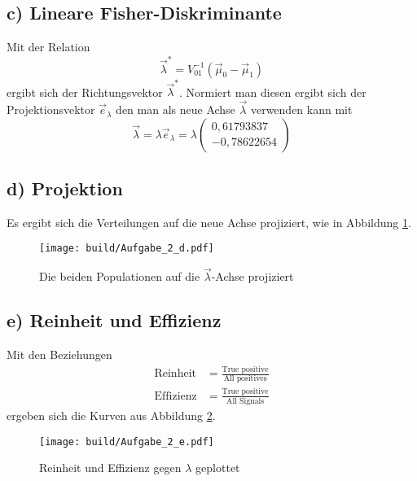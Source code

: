 \subsection*{c) Lineare Fisher-Diskriminante}
Mit der Relation
\begin{equation}
    \vec{\lambda}^*=V_{01}^{-1}\left(\vec{\mu}_0 -\vec{\mu}_1 \right)
    \label{eqn:lambda}
\end{equation}
ergibt sich der Richtungsvektor $\vec{\lambda}^*$. Normiert man diesen ergibt sich der Projektionsvektor $\vec{e}_{\lambda}$
den man als neue Achse $\vec{\lambda}$ verwenden kann mit 
\begin{equation}
    \vec{\lambda}=\lambda\vec{e}_{\lambda}=\lambda\left(\begin{array}{c}
        0,61793837\\
        -0,78622654
    \end{array}\right)
\end{equation}

\subsection*{d) Projektion}
Es ergibt sich die Verteilungen auf die neue Achse projiziert, wie in Abbildung \ref{fig:Projektion_1}.
\begin{figure}
  \texttt{[image: build/Aufgabe\_2\_d.pdf]}
  \caption{Die beiden Populationen auf die $\vec{\lambda}$-Achse projiziert}
  \label{fig:Projektion_1}
\end{figure}
\subsection*{e) Reinheit und Effizienz}
Mit den Beziehungen
\begin{align}
    \text{Reinheit}&=\frac{\text{True positive}}{\text{All positives}}    \label{eqn:Reinheit}\\
    \text{Effizienz}&=\frac{\text{True positive}}{\text{All Signals}}     \label{eqn:Effizienz}
\end{align}
ergeben sich die Kurven aus Abbildung \ref{fig:Reinheit_Effizienz}.
\begin{figure}
  \texttt{[image: build/Aufgabe\_2\_e.pdf]}
  \caption{Reinheit und Effizienz gegen $\lambda$ geplottet}
  \label{fig:Reinheit_Effizienz}
\end{figure}

